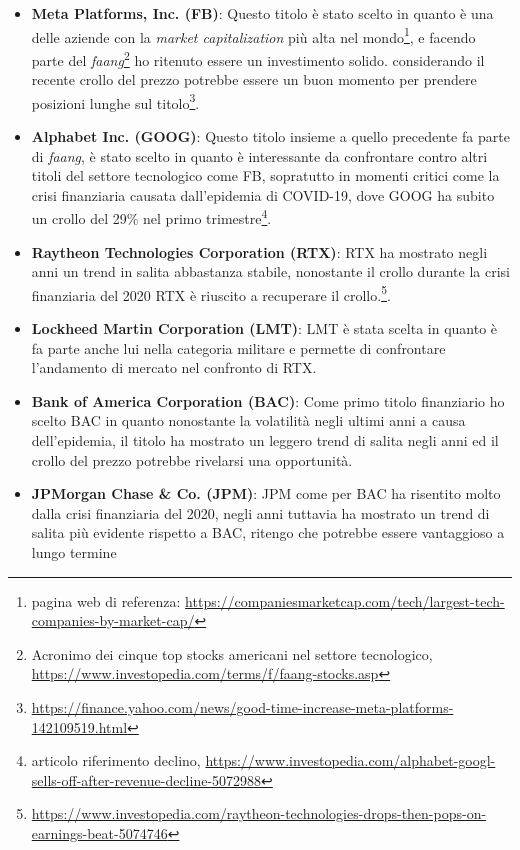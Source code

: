 \documentclass{article}
\begin{document}
\begin{itemize}
  \item \textbf{Meta Platforms, Inc. (FB)}: Questo titolo è stato scelto in quanto è  una delle aziende con la \emph{market capitalization} più alta nel mondo\footnote{pagina web di referenza: \href{https://companiesmarketcap.com/tech/largest-tech-companies-by-market-cap/}{https://companiesmarketcap.com/tech/largest-tech-companies-by-market-cap/}},
  e facendo parte del \emph{faang}\footnote{Acronimo dei cinque top stocks americani nel settore tecnologico, \href{https://www.investopedia.com/terms/f/faang-stocks.asp}{https://www.investopedia.com/terms/f/faang-stocks.asp}} ho ritenuto essere un investimento solido.
  considerando il recente crollo del prezzo potrebbe essere un buon momento per prendere posizioni lunghe sul titolo\footnote{\href{https://finance.yahoo.com/news/good-time-increase-meta-platforms-142109519.html}{https://finance.yahoo.com/news/good-time-increase-meta-platforms-142109519.html}}.

  \item \textbf{Alphabet Inc. (GOOG)}: Questo titolo insieme a quello precedente fa parte di \emph{faang}\footnotemark[2], è stato scelto in quanto è interessante da confrontare contro altri titoli del settore tecnologico come FB, sopratutto in momenti critici come la crisi finanziaria causata
  dall'epidemia di COVID-19, dove GOOG ha subito un crollo del 29\% nel primo trimestre\footnote{articolo riferimento declino, \href{https://www.investopedia.com/alphabet-googl-sells-off-after-revenue-decline-5072988}{https://www.investopedia.com/alphabet-googl-sells-off-after-revenue-decline-5072988}}.
  
  \item \textbf{Raytheon Technologies Corporation (RTX)}: RTX ha mostrato negli anni un trend in salita abbastanza stabile, nonostante il crollo durante la crisi finanziaria del 2020 RTX è riuscito a recuperare il crollo.\footnote{\href{https://www.investopedia.com/raytheon-technologies-drops-then-pops-on-earnings-beat-5074746}{https://www.investopedia.com/raytheon-technologies-drops-then-pops-on-earnings-beat-5074746}}.
  
  \item \textbf{Lockheed Martin Corporation (LMT)}: LMT è stata scelta in quanto è fa parte anche lui nella categoria militare e permette di confrontare l'andamento di mercato nel confronto di RTX.
  
  \item \textbf{Bank of America Corporation (BAC)}: Come primo titolo finanziario ho scelto BAC in quanto nonostante la volatilità negli ultimi anni a causa dell'epidemia, il titolo ha mostrato un leggero trend di salita negli anni ed il crollo del prezzo potrebbe
  rivelarsi una opportunità.
  
  \item \textbf{JPMorgan Chase \& Co. (JPM)}: JPM come per BAC ha risentito molto dalla crisi finanziaria del 2020, negli anni tuttavia ha mostrato un trend di salita più evidente rispetto a BAC, ritengo che potrebbe essere vantaggioso a lungo termine
\end{itemize}
\end{document}
